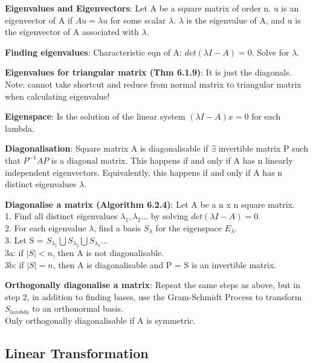 \documentclass[a4paper,landscape]{article}
\newcommand{\rntopic}[1]{\vspace{-2.0em}\subsection*{#1}\vspace{-1.0em}}
\newcommand{\rnname}[1]{\textbf{#1}}
\begin{document}
\begin{multicols*}{4}
\begin{flatitemize}
\item \rnname{Eigenvalues and Eigenvectors}: Let A be a square matrix of order n. u is an eigenvector of A if $Au = \lambda u$ for some scalar $\lambda$. $\lambda$ is the eigenvalue of A, and u is the eigenvector of A associated with $\lambda$.
\item \rnname{Finding eigenvalues}: Characteristic eqn of A: $det(\lambda I - A) = 0$. Solve for $\lambda$.
\item \rnname{Eigenvalues for triangular matrix (Thm 6.1.9)}: It is just the diagonals. Note: cannot take shortcut and reduce from normal matrix to triangular matrix when calculating eigenvalue!
\item \rnname{Eigenspace}: Is the solution of the linear system $\left(\lambda I - A\right)x = 0$ for each lambda.
\item \rnname{Diagonalisation}: Square matrix A is diagonalisable if $\exists$ invertible matrix P such that $P^{-1}AP$ is a diagonal matrix. This happens if and only if A has n linearly independent eigenvectors. Equivalently, this happens if and only if A has n distinct eigenvalues $\lambda$.
\item \rnname{Diagonalise a matrix (Algorithm 6.2.4)}: Let A be a n x n square matrix.\\
1. Find all distinct eigenvalues $\lambda_{1}, \lambda_{2}...$ by solving $det(\lambda I - A) = 0 $.\\
2. For each eigenvalue $\lambda$, find a basis $S_{\lambda}$ for the eigenspace $E_{\lambda}$.\\
3. Let S = $S_{\lambda_{1}} \bigcup S_{\lambda_{2}} \bigcup S_{\lambda_{3}} ...$\\
3a: if $|S| < n$, then A is not diagonalisable.\\
3b: if $|S| = n$, then A is diagonalisable and P = S is an invertible matrix.
\item \rnname{Orthogonally diagonalise a matrix}: Repeat the same steps as above, but in step 2, in addition to finding bases, use the Gram-Schmidt Process to transform $S_{lambda}$ to an orthonormal basis.\\
Only orthogonally diagonalisable if A is symmetric.
\end{flatitemize}

\rntopic{Linear Transformation}


\end{multicols*}
\end{document}
